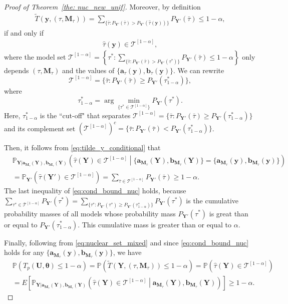\documentclass[12pt]{article}
\theoremstyle{shortspace}
\def\*#1{\bm{#1}}
\def\P{\mathbb P}
\def\A{\mathbf a}
\def\B{\mathbf b}
\begin{document}
\begin{proof}[Proof of Theorem~\ref{the: nuc_new_unif}]
Moreover, by definition
\begin{align*}
    \widetilde T(\*y, (\tau, \*M_\tau)) =  \sum_{\{\bar \tau:   P_{{\*Y}'}(\bar \tau) >   P_{{\*Y}'}(\hat \tau(\*y)) \}}  P_{{\*Y}'}(\bar \tau) \leq 1-\alpha,
\end{align*}
if and only if 
\begin{align}
\label{eq:nuclear_set_mixed}
\hat\tau(\*y) \in   \mathcal T^{[1-\alpha]},
\end{align}
where the model set $
    \mathcal T^{[1-\alpha]} = \left\{\tau^*: \sum_{\{\bar \tau:   P_{{\*Y}'}(\bar \tau) >   P_{{\*Y}'}(\tau^*) \}}  P_{{\*Y}'}(\bar \tau)\leq 1-\alpha\right\}$ only depends $(\tau, \*M_\tau)$ and the values of  
$\{\A_{\tau}(\*y),  \B_{\tau}(\*y)\}$.  We can rewrite 
 $$
 \mathcal T^{[1-\alpha]} = 
\{\bar \tau:    P_{{\*Y}'}(\bar \tau) \ge   P_{{\*Y}'}(\tau_{1-\alpha}^*) \}, $$
where
$$\tau^*_{1-\alpha} = \arg \min_{\{\tau^* \in \mathcal T^{[1-\alpha]}\}} P_{{\*Y}'}(\tau^*).$$ 
Here, $\tau^*_{1-\alpha}$ is the ``cut-off" that separates  
$\mathcal T^{[1-\alpha]} = 
\{\bar \tau:    P_{{\*Y}'}(\bar \tau) \ge   P_{{\*Y}'}(\tau_{1-\alpha}^*) \}$ and its complement set $({\mathcal T^{[1-\alpha]}})^c = 
\{\bar \tau:    P_{{\*Y}'}(\bar \tau) <   P_{{\*Y}'}(\tau_{1-\alpha}^*) \}$. 


Then, it follows from  \eqref{eq:tilde_y_conditional} that
\begin{align}
\label{eq:cond_bound_nuc}
& \P_{\*Y|\A_{\*M_\tau}(\*Y), \B_{\*M_\tau}(\*Y)}\left(  \hat\tau(\*Y) \in  \mathcal T^{[1-\alpha]} \middle | \big\{\A_{\*M_\tau}(\*Y),  \B_{\*M_\tau}(\*Y)\big\} =\big\{\A_{\*M_\tau}(\*y), \B_{\*M_\tau}(\*y)\big\} \right)   \nonumber \\
& =   \P_{{\*Y}'}\left(  \hat\tau({\*Y}') \in \mathcal T^{[1-\alpha]} \right)  = \sum_{\bar \tau \in \mathcal T^{[1-\alpha]}} P_{{\*Y}'}(\bar \tau) \geq 1-\alpha.
\end{align}
The last inequality of \eqref{eq:cond_bound_nuc} holds,  
 because 
$\sum_{\tau^* \in \mathcal T^{[1-\alpha]}} P_{{\*Y}'}(\tau^*) 
=
\sum_{\{\tau^*:   P_{{\*Y}'}(\tau^*) \geq   P_{{\*Y}'}(\tau^*_{1-\alpha}) \}}  P_{{\*Y}'}(\tau^*)$ is the cumulative probability masses of all models whose probability mass $P_{{\*Y}'}(\tau^*)$ is great than  or equal to
$P_{{\*Y}'}(\tau^*_{1-\alpha})$. This cumulative mass is greater than or equal to $\alpha$.


Finally, following from \eqref{eq:nuclear_set_mixed} and since \eqref{eq:cond_bound_nuc} holds for any $\{\A_{\*M_\tau}(\*y), \B_{\*M_\tau}(\*y)\}$, we have
{
\begin{align*}
     &   \P(T_p(\*U, \*\theta) \leq 1-\alpha) = \P(\widetilde T(\*Y, (\tau, \*M_\tau)) \leq 1-\alpha)  =   \P\left( \hat \tau(\*Y) \in \mathcal T^{[1-\alpha]}\right)\\
     & = E \left[  \P_{\*Y|\A_{\*M_\tau}(\*Y), \B_{\*M_\tau}(\*Y)}\left(  \hat\tau(\*Y) \in \mathcal T^{[1-\alpha]} \middle | \A_{\*M_\tau}(\*Y),\B_{\*M_\tau}(\*Y)\right)\right] \geq 1- \alpha.
\end{align*}
}
\end{proof}
\end{document}
